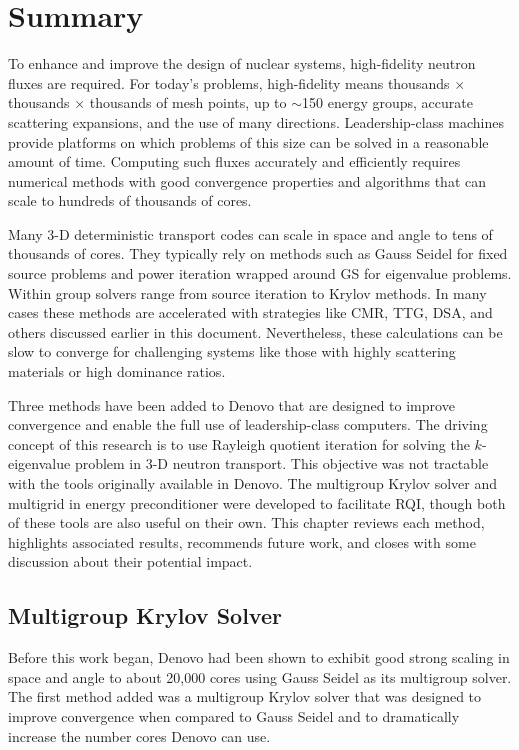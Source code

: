 
\chapter{Summary}
\label{sec:Chp5}
To enhance and improve the design of nuclear systems, high-fidelity neutron fluxes are required. For today's problems, high-fidelity means thousands $\times$ thousands $\times$ thousands of mesh points, up to $\sim$150 energy groups, accurate scattering expansions, and the use of many directions. Leadership-class machines provide platforms on which problems of this size can be solved in a reasonable amount of time. Computing such fluxes accurately and efficiently requires numerical methods with good convergence properties and algorithms that can scale to hundreds of thousands of cores. 

Many 3-D deterministic transport codes can scale in space and angle to tens of thousands of cores. They typically rely on methods such as Gauss Seidel for fixed source problems and power iteration wrapped around GS for eigenvalue problems. Within group solvers range from source iteration to Krylov methods. In many cases these methods are accelerated with strategies like CMR, TTG, DSA, and others discussed earlier in this document. Nevertheless, these calculations can be slow to converge for challenging systems like those with highly scattering materials or high dominance ratios. 

Three methods have been added to Denovo that are designed to improve convergence and enable the full use of leadership-class computers. The driving concept of this research is to use Rayleigh quotient iteration for solving the $k$-eigenvalue problem in 3-D neutron transport. This objective was not tractable with the tools originally available in Denovo. The multigroup Krylov solver and multigrid in energy preconditioner were developed to facilitate RQI, though both of these tools are also useful on their own. This chapter reviews each method, highlights associated results, recommends future work, and closes with some discussion about their potential impact. 

\section{Multigroup Krylov Solver}
Before this work began, Denovo had been shown to exhibit good strong scaling in space and angle to about 20,000 cores using Gauss Seidel as its multigroup solver. The first method added was a multigroup Krylov solver that was designed to improve convergence when compared to Gauss Seidel and to dramatically increase the number cores Denovo can use. 

